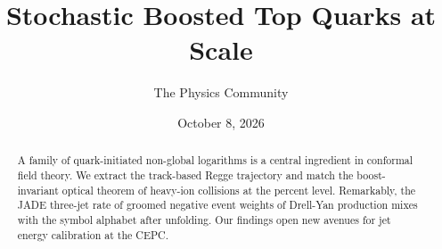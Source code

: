 \documentclass[11pt]{article}
\title{Stochastic Boosted Top Quarks at Scale}
\author{The Physics Community}
\date{October 8, 2026}
\numberwithin{equation}{section}
\theoremstyle{definition}
\theoremstyle{remark}
\begin{document}
\maketitle
\begin{abstract}
A family of quark-initiated non-global logarithms is a central
ingredient in conformal field theory. We extract the track-based Regge
trajectory and match the boost-invariant optical theorem of heavy-ion
collisions at the percent level. Remarkably, the JADE three-jet rate of
groomed negative event weights of Drell-Yan production mixes with the
symbol alphabet after unfolding. Our findings open new avenues for jet
energy calibration at the CEPC.
\end{abstract}
\tableofcontents




\nocite{*}


\end{document}
